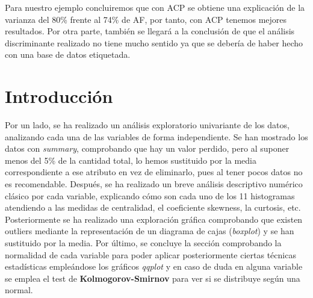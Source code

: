 \documentclass[11pt,a4paper]{article}
\begin{document}
        Para nuestro ejemplo concluiremos que con ACP se obtiene una explicación de la varianza del 80\% frente al 74\% de AF, por tanto, con ACP tenemos mejores resultados. Por otra parte, también se llegará a la conclusión de que el análisis discriminante realizado no tiene mucho sentido ya que se debería de haber hecho con una base de datos etiquetada.
	
	\section{Introducción}
	
        Por un lado, se ha realizado un análisis exploratorio univariante de los datos, analizando cada una de las variables de forma independiente. Se han mostrado los datos con \textit{summary}, comprobando que hay un valor perdido, pero al suponer menos del 5\% de la cantidad total, lo hemos sustituido por la media correspondiente a ese atributo en vez de eliminarlo, pues al tener pocos datos no es recomendable. Después, se ha realizado un breve análisis descriptivo numérico clásico por cada variable, explicando cómo son cada uno de los 11 histogramas atendiendo a las medidas de centralidad, el coeficiente skewness, la curtosis, etc. Posteriormente se ha realizado una exploración gráfica comprobando que existen outliers mediante la representación de un diagrama de cajas (\textit{boxplot}) y se han sustituido por la media. Por último, se concluye la sección comprobando la normalidad de cada variable para poder aplicar posteriormente ciertas técnicas estadísticas empleándose los gráficos \textit{qqplot} y en caso de duda en alguna variable se emplea el test de \textbf{Kolmogorov-Smirnov} para ver si se distribuye según una normal. \\ 
    
\end{document}
